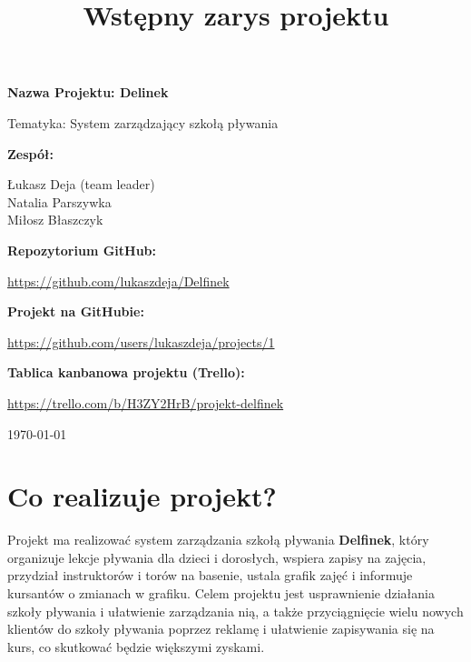 \documentclass[a4paper,12pt]{article}
\title{Wstępny zarys projektu}
\begin{document}
\begin{titlepage}
    \centering



    {\Huge \textbf{Nazwa Projektu: Delinek}\par}
    \vspace{0.5cm}

    {\Large Tematyka: System zarządzający szkołą pływania\par}
    \vspace{2cm}

    {\large \textbf{Zespół:}\par}
    \vspace{0.5cm}
    {\large
    Łukasz Deja (team leader)\\
    Natalia Parszywka\\
    Miłosz Błaszczyk\\
    }
    \vspace{2cm}

    {\large \textbf{Repozytorium GitHub:}\par}
    \href{https://github.com/lukaszdeja/Delfinek}{https://github.com/lukaszdeja/Delfinek}

    \vspace{1cm}
    
    {\large \textbf{Projekt na GitHubie:}\par}
    \href{https://github.com/users/lukaszdeja/projects/1}{https://github.com/users/lukaszdeja/projects/1}
    
    \vspace{1cm}
    
    {\large \textbf{Tablica kanbanowa projektu (Trello):}\par}
    \href{https://trello.com/b/H3ZY2HrB/projekt-delfinek}{https://trello.com/b/H3ZY2HrB/projekt-delfinek}

    \vfill

    {\large \today\par}

\end{titlepage}



\section{Co realizuje projekt?}

Projekt ma realizować system zarządzania szkołą pływania \textbf{Delfinek}, który organizuje lekcje pływania dla dzieci i dorosłych, wspiera zapisy na zajęcia, przydział instruktorów i torów na basenie, ustala grafik zajęć i informuje kursantów o zmianach w grafiku. Celem projektu jest usprawnienie działania szkoły pływania i ułatwienie zarządzania nią, a także przyciągnięcie wielu nowych klientów do szkoły pływania poprzez reklamę i ułatwienie zapisywania się na kurs, co skutkować będzie większymi zyskami.
\end{document}
